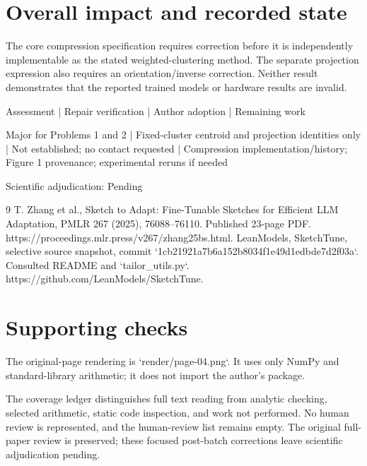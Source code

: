 \documentclass[10pt]{article}
\begin{document}
\section*{Overall impact and recorded state}
The core compression specification requires correction before it is independently implementable as the stated weighted-clustering method. The separate projection expression also requires an orientation/inverse correction. Neither result demonstrates that the reported trained models or hardware results are invalid.\par
Assessment | Repair verification | Author adoption | Remaining work\par
Major for Problems 1 and 2 | Fixed-cluster centroid and projection identities only | Not established; no contact requested | Compression implementation/history; Figure 1 provenance; experimental reruns if needed\par
Scientific adjudication: Pending\par
9 T. Zhang et al., Sketch to Adapt: Fine-Tunable Sketches for Efficient LLM Adaptation, PMLR 267 (2025), 76088–76110. Published 23-page PDF. https://proceedings.mlr.press/v267/zhang25bs.html. LeanModels, SketchTune, selective source snapshot, commit `1cb21921a7b6a152b8034f1e49d1edbde7d2f03a`. Consulted README and `tailor\_utils.py`. https://github.com/LeanModels/SketchTune.\par
\section*{Supporting checks}
The original-page rendering is `render/page-04.png`. It uses only NumPy and standard-library arithmetic; it does not import the author’s package.\par
The coverage ledger distinguishes full text reading from analytic checking, selected arithmetic, static code inspection, and work not performed. No human review is represented, and the human-review list remains empty. The original full-paper review is preserved; these focused post-batch corrections leave scientific adjudication pending.\par
\end{document}
